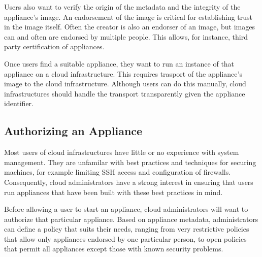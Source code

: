 Users also want to verify the origin of the metadata and the integrity
of the appliance's image.  An endorsement of the image is critical for
establishing trust in the image itself.  Often the creator is also an
endorser of an image, but images can and often are endorsed by
multiple people.  This allows, for instance, third party certification
of appliances.

Once users find a suitable appliance, they want to run an instance of
that appliance on a cloud infrastructure.  This requires trasport of
the appliance's image to the cloud infrastructure.  Although users
can do this manually, cloud infrastructures should handle
the transport transparently given the appliance identifier.

\subsection{Authorizing an Appliance}

Most users of cloud infrastructures have little or no experience with
system management.  They are unfamilar with best practices and
techniques for securing machines, for example limiting SSH access and
configuration of firewalls.  Consequently, cloud administrators have a
strong interest in ensuring that users run appliances that have been
built with these best practices in mind.

Before allowing a user to start an appliance, cloud administrators
will want to authorize that particular appliance.  Based on appliance
metadata, administrators can define a policy that suits their needs,
ranging from very restrictive policies that allow only appliances endorsed by
one particular person, to open policies that permit all 
appliances except those with known security problems.
